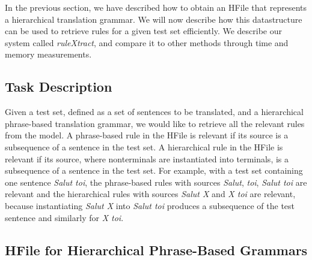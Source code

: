 In the previous section, we have described how to obtain an HFile
that represents a hierarchical translation grammar.
We will now describe how this datastructure can be used to retrieve rules for
a given test set efficiently. We describe our system called
\emph{ruleXtract}, and compare it to other methods through time and memory
measurements.

\subsection{Task Description}

Given a test set, defined as a set of sentences to be translated, and a
hierarchical phrase-based translation grammar, we would
like to retrieve all the relevant rules from the model. A phrase-based rule
in the HFile is
relevant if its source is a subsequence of a sentence in the test set. A
hierarchical rule in the HFile is relevant if
its source, where nonterminals are instantiated into
terminals, is
a subsequence of a sentence in the test set. For example, with a test set
containing one sentence \emph{Salut toi}, the phrase-based rules with sources
\emph{Salut}, \emph{toi}, \emph{Salut toi} are relevant and the hierarchical
rules with sources \emph{Salut X} and \emph{X toi} are relevant, because
instantiating \emph{Salut X} into \emph{Salut toi} produces a subsequence
of the test sentence and similarly for \emph{X toi}.

\subsection{HFile for Hierarchical Phrase-Based Grammars}
\label{sec:hfileForHiero}


